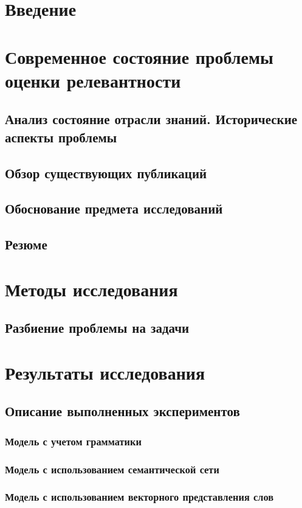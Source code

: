 \documentclass[a4paper,14pt,oneside,openany]{memoir}
\begin{document}
\sloppy

\tableofcontents
\chapter*{Введение}

\chapter{Современное состояние проблемы оценки релевантности}
\section{Анализ состояние отрасли знаний. Исторические аспекты проблемы}

\section{Обзор существующих публикаций}

\section{Обоснование предмета исследований}

\section{Резюме}

\chapter{Методы исследования}

\section{Разбиение проблемы на задачи}

\chapter{Результаты исследования}
\section{Описание выполненных экспериментов}

\subsection{Модель с учетом грамматики}

\subsection{Модель с использованием семантической сети}

\subsection{Модель с использованием векторного представления слов}

\printbibliography[title={Список использованных источников},category=cited]
\printbibliography[title={Непроцитированные источники (должно быть пусто)},notcategory=cited]
\end{document}
